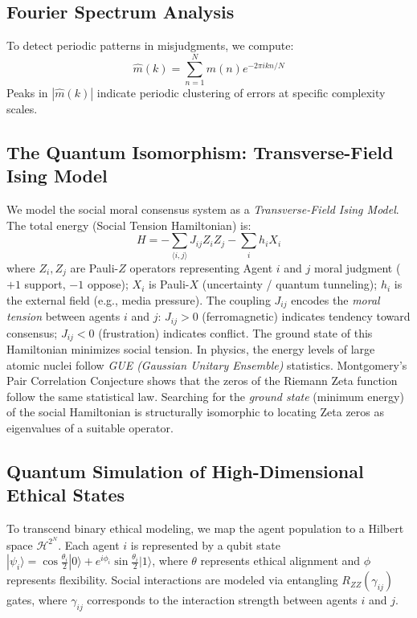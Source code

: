 \documentclass[12pt,a4paper]{article}
\theoremstyle{definition}
\theoremstyle{remark}
\begin{document}
\subsection{Fourier Spectrum Analysis}

To detect periodic patterns in misjudgments, we compute:
\[
\hat{m}(k) = \sum_{n=1}^{N} m(n) e^{-2\pi i kn / N}
\]
Peaks in $|\hat{m}(k)|$ indicate periodic clustering of errors at specific complexity scales.

\subsection{The Quantum Isomorphism: Transverse-Field Ising Model}
\label{sec:quantum_ising}

We model the social moral consensus system as a \emph{Transverse-Field Ising Model}. The total energy (Social Tension Hamiltonian) is:
\[
H = -\sum_{\langle i,j \rangle} J_{ij} Z_i Z_j - \sum_{i} h_i X_i
\]
where $Z_i, Z_j$ are Pauli-$Z$ operators representing Agent $i$ and $j$ moral judgment ($+1$ support, $-1$ oppose); $X_i$ is Pauli-$X$ (uncertainty / quantum tunneling); $h_i$ is the external field (e.g., media pressure). The coupling $J_{ij}$ encodes the \emph{moral tension} between agents $i$ and $j$: $J_{ij} > 0$ (ferromagnetic) indicates tendency toward consensus; $J_{ij} < 0$ (frustration) indicates conflict. The ground state of this Hamiltonian minimizes social tension. In physics, the energy levels of large atomic nuclei follow \emph{GUE (Gaussian Unitary Ensemble)} statistics. Montgomery's Pair Correlation Conjecture shows that the zeros of the Riemann Zeta function follow the same statistical law. Searching for the \emph{ground state} (minimum energy) of the social Hamiltonian is structurally isomorphic to locating Zeta zeros as eigenvalues of a suitable operator.

\subsection{Quantum Simulation of High-Dimensional Ethical States}
\label{sec:quantum_hilbert}

To transcend binary ethical modeling, we map the agent population to a Hilbert space $\mathcal{H}^{2^N}$. Each agent $i$ is represented by a qubit state
$|\psi_i\rangle = \cos\frac{\theta_i}{2}|0\rangle + e^{i\phi_i}\sin\frac{\theta_i}{2}|1\rangle$, where $\theta$ represents ethical alignment and $\phi$ represents flexibility. Social interactions are modeled via entangling $R_{ZZ}(\gamma_{ij})$ gates, where $\gamma_{ij}$ corresponds to the interaction strength between agents $i$ and $j$.
\end{document}

